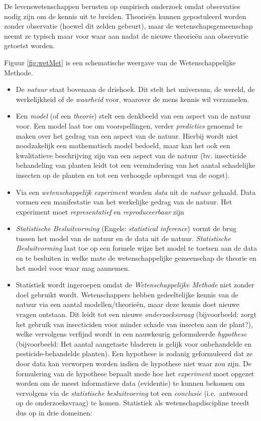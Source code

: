 \documentclass[
  12pt,dutch]{book}
\theoremstyle{definition}
\theoremstyle{definition}
\theoremstyle{definition}
\theoremstyle{definition}
\theoremstyle{remark}
\begin{document}
De levenswetenschappen berusten op empirisch onderzoek omdat observaties nodig zijn om de kennis uit te breiden. Theorieën kunnen gepostuleerd worden zonder observatie (hoewel dit zelden gebeurt), maar de wetenschapsgemeenschap neemt ze typisch maar voor waar aan nadat de nieuwe theorieën aan observatie getoetst worden.

Figuur \ref{fig:wetMet} is een schematische weergave van de Wetenschappelijke Methode.

\begin{itemize}
\item
  De \emph{natuur} staat bovenaan de driehoek. Dit stelt het universum, de wereld, de werkelijkheid of de \emph{waarheid} voor, waarover de mens kennis wil verzamelen.
\item
  Een \emph{model} (of een \emph{theorie}) stelt een denkbeeld van een aspect van de natuur voor. Een model laat toe om voorspellingen, verder \emph{predicties} genoemd te maken over het gedrag van een aspect van de natuur. Hierbij wordt niet noodzakelijk een mathematisch model bedoeld, maar kan het ook een kwalitatieve beschrijving zijn van een aspect van de natuur (bv. insecticide behandeling van planten leidt tot een vermindering van het aantal schadelijke insecten op de planten en tot een verhoogde opbrengst van de oogst).
\item
  Via een \emph{wetenschappelijk experiment} worden \emph{data} uit de \emph{natuur} gehaald. Data vormen een manifestatie van het werkelijke gedrag van de natuur. Het experiment moet \emph{representatief} en \emph{reproduceerbaar} zijn
\item
  \emph{Statistische Besluitvorming} (Engels: \emph{statistical inference}) vormt de brug tussen het model van de natuur en de data uit de natuur. \emph{Statistische Besluitvorming} laat toe op een formele wijze het model te toetsen aan de data en te besluiten in welke mate de wetenschappelijke gemeenschap de theorie en het model voor waar mag aannemen.
\item
  Statistiek wordt ingeroepen omdat de \emph{Wetenschappelijke Methode} niet zonder doel gebruikt wordt. Wetenschappers hebben gedeeltelijke kennis van de natuur via een aantal modellen/theorieën, maar deze kennis doet nieuwe vragen ontstaan. Dit leidt tot een nieuwe \emph{onderzoeksvraag} (bijvoorbeeld: zorgt het gebruik van insecticiden voor minder schade van insecten aan de plant?), welke vervolgens verfijnd wordt in een nauwkeurig geformuleerde \emph{hypothese} (bijvoorbeeld: Het aantal aangetaste bladeren is gelijk voor onbehandelde en pesticide-behandelde planten). Een hypothese is zodanig geformuleerd dat ze door data kan verworpen worden indien de hypothese niet waar zou zijn. De formulering van de hypothese bepaalt mede hoe het \emph{experiment} moet opgezet worden om de meest informatieve data (evidentie) te kunnen bekomen om vervolgens via de \emph{statistische besluitvoering} tot een \emph{conclusie} (i.e.~antwoord op de onderzoeksvraag) te komen. Statistiek als wetenschapdiscipline treedt dus op in drie domeinen:


\end{itemize}
\end{document}
